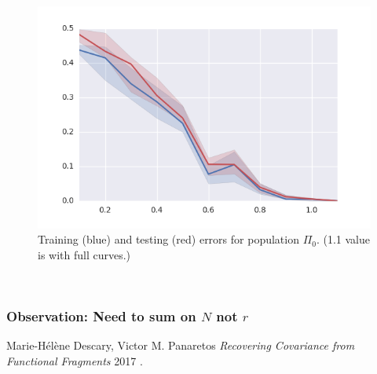 \documentclass[10pt, a4paper]{article}
\theoremstyle{remark}
\begin{document}
\begin{figure}
\centering
\includegraphics[width=0.7\linewidth]{Code/report_images/err2}
\caption{Training (blue) and testing (red) errors for population $\Pi_0$. (1.1 value is with full curves.)}
\label{fig:err2}
\end{figure}\\

\subsubsection*{Observation: Need to sum on $N$ not $r$}



\begin{thebibliography}{1}
	
	 Marie-Hélène Descary, Victor M. Panaretos {\em Recovering Covariance from Functional Fragments}  2017	.
	
\end{thebibliography}
\end{document}
